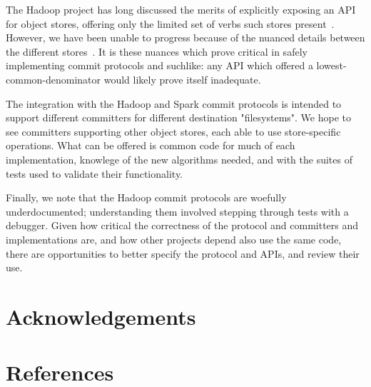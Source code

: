 \documentclass[conference]{IEEEtran}
\begin{document}
The Hadoop project has long discussed the merits of explicitly
exposing an API for object stores, offering only the limited
set of verbs such stores present\ \cite{HADOOP-9565}.
However, we have been unable to progress because of the nuanced details
between the different stores\ \cite{S3, WASB, ADL, GCS}.
It is these nuances which prove critical in safely implementing
commit protocols and suchlike: any API which offered a lowest-common-denominator
would likely prove itself inadequate.

The integration with the Hadoop and Spark commit protocols is intended
to support different committers for different destination "filesystems".
We hope to see committers supporting other object stores, each
able to use store-specific operations.
What can be offered is common code for much of each implementation,
knowlege of the new algorithms needed, and
with the suites of tests used to validate their functionality.


Finally, we note that the Hadoop commit protocols are woefully underdocumented;
understanding them involved stepping through tests with a debugger.
Given how critical the correctness of the protocol and committers and implementations
are, and how other projects depend also use the same code, there
are opportunities to better specify the protocol and APIs, and review
their use.


\section*{Acknowledgements}
\label{sec:acknowledgements}


\section{References}
\label{sec:references}




\end{document}
